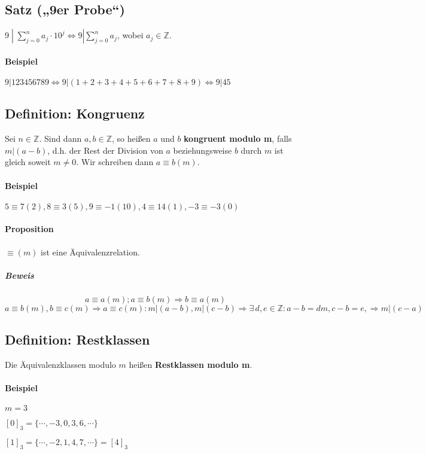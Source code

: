 \documentclass[14pt,a4paper]{article}
\newcommand{\Z}{\ensuremath{\mathbb{Z}}}
\begin{document}
  \subsection{Satz („9er Probe“)}
  $ 9 \;| \; \sum_{j=0}^n a_j \cdot 10^j \Leftrightarrow 9 | \sum_{j=0}^n a_j $,
  wobei $a_j \in \Z$.

  \paragraph{Beispiel}
  $ 9 | 123456789 \Leftrightarrow 9 | (1+2+3+4+5+6+7+8+9) \Leftrightarrow 9 | 45
  $

  \subsection{Definition: Kongruenz}
  Sei $ n \in \Z $. Sind dann $a,b \in \Z$, so heißen $a$ und $b$
  \textbf{kongruent modulo m}, falls $m | (a-b)$, d.h. der Rest der Division von
  $a$ beziehungsweise $b$ durch $m$ ist gleich soweit $m \neq 0$.
  Wir schreiben dann $ a \equiv b (m)$.

  \paragraph{Beispiel}
  $5 \equiv 7 (2), 8 \equiv 3 (5), 9 \equiv -1 (10), 4 \equiv 14 (1), -3 \equiv -3 (0)$

  \paragraph{Proposition}
  $ \equiv (m) $ ist eine Äquivalenzrelation.

  \subparagraph{Beweis}
  $$ a \equiv a (m) ; a \equiv b (m) \Rightarrow b \equiv a (m)$$
  $$a \equiv b (m), b \equiv c (m) \Rightarrow a \equiv c (m) : m | (a-b), m|
  (c-b) \Rightarrow \exists \, d,e \in \Z : a-b = dm, c-b=e, \Rightarrow
  m|(c-a)$$

  \subsection{Definition: Restklassen}
  Die Äquivalenzklassen modulo $m$ heißen \textbf{Restklassen modulo m}.

  \paragraph{Beispiel}
  $ m = 3 $

  $ [0]_3 = \{ \dotsb, -3, 0, 3, 6, \dotsb \} $ \par
  $ [1]_3 = \{ \dotsb, -2, 1, 4, 7, \dotsb \} = [4]_3 $
\end{document}
